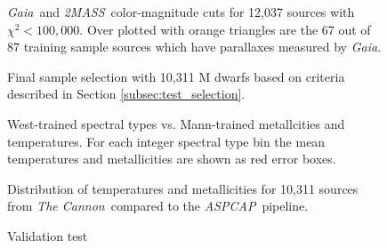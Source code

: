 \documentclass[modern]{aastex62}
\newcommand{\thecannon}{\textsl{The Cannon}}
\newcommand{\aspcap}{\textsl{ASPCAP}}
\newcommand{\gaia}{\textsl{Gaia}}
\newcommand{\zmass}{\textsl{2MASS}}
\begin{document}
\begin{figure}[ht]
\caption{\gaia\ and \zmass\ color-magnitude cuts for 12,037 sources with $\chi^2<100,000$. Over plotted with orange triangles are the 67 out of 87 training sample sources which have parallaxes measured by \gaia. \label{fig:cmd_selection}}
\end{figure}

\begin{figure}[ht]
\caption{Final sample selection with 10,311 M dwarfs based on criteria described in Section \ref{subsec:test_selection}. \label{fig:safe_selection}}
\end{figure}

\begin{figure}[ht]
\caption{West-trained spectral types vs. Mann-trained metallcities and temperatures. For each integer spectral type bin the mean temperatures and metallicities are shown as red error boxes. \label{fig:west_vs_mann}}
\end{figure}

\begin{figure}[ht]
\caption{Distribution of temperatures and metallicities for 10,311 sources from \thecannon\ compared to the \aspcap\ pipeline. \label{fig:aspcap_cannon_label_hist}}
\end{figure}

\begin{figure}[ht]
\caption{Validation test \label{fig:aspcap_cannon_validation}}
\end{figure}



\end{document}
